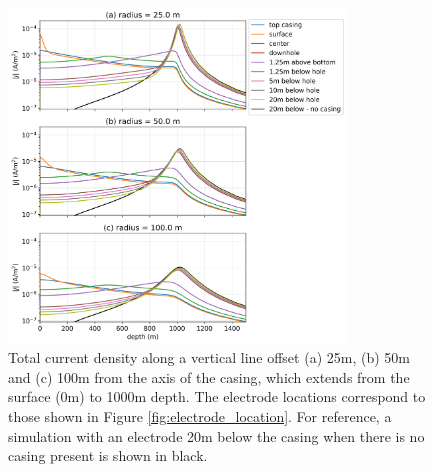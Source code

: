 \begin{figure}
    \begin{center}
    \includegraphics[width=0.8\textwidth]{figures/dc_casing/electrode_location_currents.png}
    \end{center}
\caption{
    Total current density along a vertical line offset (a) 25m, (b) 50m and (c) 100m
    from the axis of the casing, which extends
    from the surface (0m) to 1000m depth.
    The electrode locations correspond to those shown in Figure \ref{fig:electrode_location}.
    For reference, a simulation with an electrode 20m below the casing when there is no casing present
    is shown in black.
}
\label{fig:electrode_location_currents}
\end{figure}
